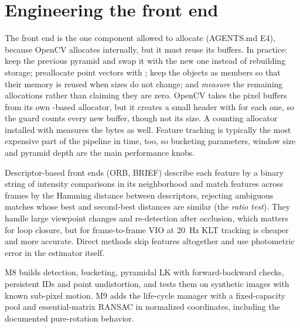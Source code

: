 \section{Engineering the front end}

The front end is the one component allowed to allocate (AGENTS.md E4), because OpenCV allocates internally, but it must reuse its buffers. In practice: keep the
previous pyramid and swap it with the new one instead of rebuilding storage; preallocate point vectors with ; keep the  objects as members
so that their memory is reused when sizes do not change; and \emph{measure} the remaining allocations rather than claiming they are zero. OpenCV takes the
pixel buffers from its own -based allocator, but it creates a small header with  for each one, so the  guard counts every new
 buffer, though not its size. A counting allocator installed with  measures the bytes as well.
Feature tracking is typically the most expensive part of the pipeline in time, too, so bucketing parameters, window size and pyramid depth are the main
performance knobs.

Descriptor-based front ends (ORB, BRIEF) describe each feature by a binary string of intensity comparisons in its neighborhood and match features across frames by
the Hamming distance between descriptors, rejecting ambiguous matches whose best and second-best distances are similar (the \emph{ratio test}). They handle large
viewpoint changes and re-detection after occlusion, which matters for loop closure, but for frame-to-frame VIO at 20~Hz KLT tracking is cheaper and more accurate.
Direct methods skip features altogether and use photometric error in the estimator itself.

\begin{projectlink}
M8 builds detection, bucketing, pyramidal LK with forward-backward checks, persistent IDs and point undistortion, and tests them on synthetic images with known
sub-pixel motion. M9 adds the life-cycle manager with a fixed-capacity pool and essential-matrix RANSAC in normalized coordinates, including the documented
pure-rotation behavior.
\end{projectlink}

